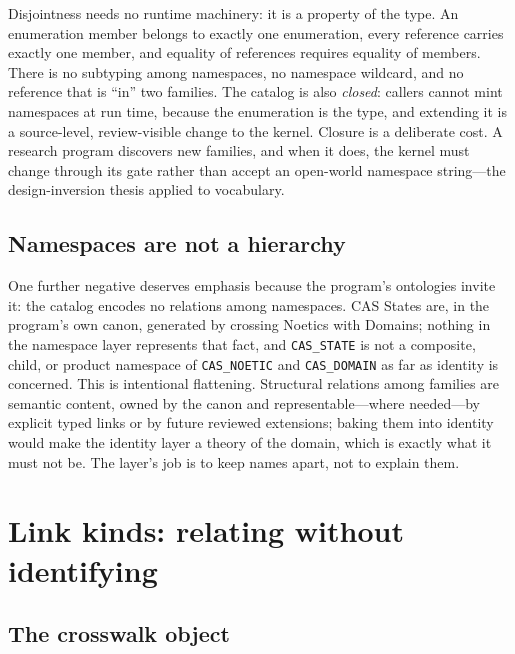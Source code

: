 Disjointness needs no runtime machinery: it is a property of the
type. An enumeration member belongs to exactly one enumeration,
every reference carries exactly one member, and equality of
references requires equality of members. There is no subtyping
among namespaces, no namespace wildcard, and no reference that is
``in'' two families. The catalog is also \emph{closed}: callers
cannot mint namespaces at run time, because the enumeration is the
type, and extending it is a source-level, review-visible change to
the kernel. Closure is a deliberate cost. A research program
discovers new families, and when it does, the kernel must change
through its gate rather than accept an open-world namespace
string---the design-inversion thesis applied to vocabulary.

\subsection{Namespaces are not a hierarchy}\label{ch03:nohierarchy}

One further negative deserves emphasis because the program's
ontologies invite it: the catalog encodes no relations among
namespaces. CAS States are, in the program's own canon, generated
by crossing Noetics with Domains; nothing in the namespace layer
represents that fact, and \texttt{CAS\_STATE} is not a composite,
child, or product namespace of \texttt{CAS\_NOETIC} and
\texttt{CAS\_DOMAIN} as far as identity is concerned. This is
intentional flattening. Structural relations among families are
semantic content, owned by the canon and representable---where
needed---by explicit typed links or by future reviewed extensions;
baking them into identity would make the identity layer a theory
of the domain, which is exactly what it must not be. The layer's
job is to keep names apart, not to explain them.

\section{Link kinds: relating without identifying}\label{ch03:linkkinds}

\subsection{The crosswalk object}\label{ch03:crosswalk}

